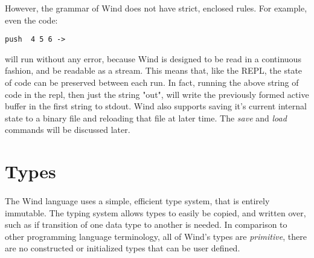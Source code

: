 \par However, the grammar of Wind does not have strict, enclosed rules. For example, even the code: \\

\begin{verbatim}
push  4 5 6 ->
\end{verbatim}

will run without any error, because Wind is designed to be read in a continuous fashion, and be readable as a stream. This means that, like the REPL, the state of code can be preserved between each run.  In fact, running the above string of code in the repl, then just the string "out", will write the previously formed active buffer in the first string to stdout. Wind also supports saving it's current internal state to a binary file and reloading that file at later time. The \emph{save} and \emph{load} commands will be discussed later.

\section{Types}

\paragraph{  } The Wind language uses a simple, efficient type system, that is entirely immutable. The typing system allows types to easily be copied, and written over, such as if transition of one data type to another is needed. In comparison to other programming language terminology, all of Wind's types are \emph{primitive}, there are no constructed or initialized types that can be user defined.





